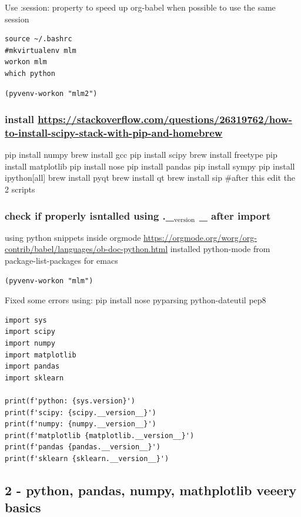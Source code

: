 \documentclass[11pt]{article}
\begin{document}
Use :session: property to speed up org-babel when possible to use the same session
\begin{verbatim}
source ~/.bashrc
#mkvirtualenv mlm
workon mlm
which python
\end{verbatim}

\begin{verbatim}
(pyvenv-workon "mlm2")
\end{verbatim}

\subsubsection{install \url{https://stackoverflow.com/questions/26319762/how-to-install-scipy-stack-with-pip-and-homebrew}}
\label{sec:org0f36066}
pip install numpy
brew install gcc
pip install scipy
brew install freetype
pip install matplotlib
pip install nose
pip install pandas
pip install sympy
pip install ipython[all]
brew install pyqt
brew install qt
brew install sip
\#after this edit the 2 scripts
\subsubsection{check if properly isntalled using .\_\(_{\text{version}}\) \_ after import}
\label{sec:orgaf0e39b}

using python snippets inside orgmode \url{https://orgmode.org/worg/org-contrib/babel/languages/ob-doc-python.html}
installed python-mode from package-list-packages for emacs
\begin{verbatim}
(pyvenv-workon "mlm")
\end{verbatim}

Fixed some errors using: pip install nose pyparsing python-dateutil pep8
\begin{verbatim}
import sys
import scipy
import numpy
import matplotlib
import pandas
import sklearn

print(f'python: {sys.version}')
print(f'scipy: {scipy.__version__}')
print(f'numpy: {numpy.__version__}')
print(f'matplotlib {matplotlib.__version__}')
print(f'pandas {pandas.__version__}')
print(f'sklearn {sklearn.__version__}')

\end{verbatim}

\subsection{2 - python, pandas, numpy, mathplotlib veeery basics}
\label{sec:org0cc4a60}
\end{document}
